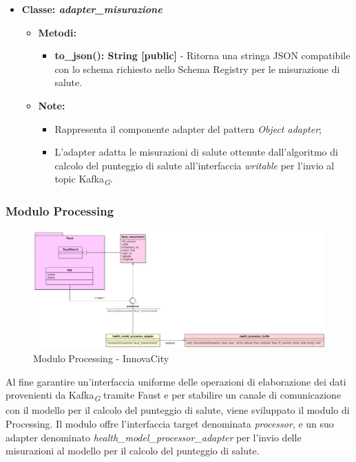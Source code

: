 \begin{itemize}
\begin{itemize}
\begin{itemize}
        \end{itemize}
    \end{itemize}
    \item{\textbf{Classe: \textit{adapter\_misurazione}}}
    \begin{itemize}
        \item \textbf{Metodi: }
        \begin{itemize}
            \item \textbf{to\_json(): String [public]} - Ritorna una stringa JSON compatibile con lo schema richiesto nello Schema Registry per le misurazione di salute.
        \end{itemize}
        \item\textbf{Note:}
        \begin{itemize}
            \item Rappresenta il componente adapter del pattern \textit{Object adapter};
            \item L'adapter adatta le misurazioni di salute ottenute dall'algoritmo di calcolo del punteggio di salute all'interfaccia \textit{writable} per l'invio al topic Kafka\textsubscript{\textit{G}}.
        \end{itemize}
    \end{itemize}
\end{itemize}

\subsubsection{Modulo Processing}
\begin{figure}[H]
    \centering
    \includegraphics[width=1\textwidth]{../Images/SpecificaTecnica/processorFaust.PNG}
    \caption{Modulo Processing - InnovaCity}
    \label{fig: processHealth}
\end{figure}
Al fine garantire un'interfaccia uniforme delle operazioni di elaborazione dei dati provenienti da Kafka\textsubscript{\textit{G}} tramite Faust e per stabilire un canale di comunicazione con il modello per il calcolo del punteggio di salute, viene sviluppato il modulo di Processing. Il modulo offre l'interfaccia target denominata \textit{processor}, e un suo adapter denominato \textit{health\_model\_processor\_adapter} per l'invio delle misurazioni al modello per il calcolo del punteggio di salute.

